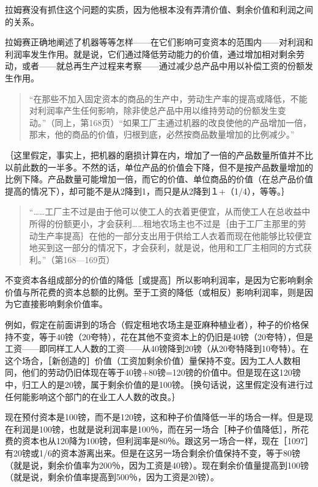 拉姆赛没有抓住这个问题的实质，因为他根本没有弄清价值、剩余价值和利润之间的关系。


拉姆赛正确地阐述了机器等等怎样——在它们影响可变资本的范围内——对利润和利润率发生作用。就是说，它们通过降低劳动能力的价值，通过增加相对剩余劳动，或者——就总再生产过程来考察——通过减少总产品中用以补偿工资的份额发生作用。

\begin{quote}{“在那些不加入固定资本的商品的生产中，劳动生产率的提高或降低，不能对利润率产生任何影响，除非使总产品中用以维持劳动的份额发生变动。”（同上，第168页）“如果工厂主通过机器的改良使他的产品增加一倍，那末，他的商品的价值，归根到底，必然按商品数量增加的比例减少。”}\end{quote}

｛这里假定，事实上，把机器的磨损计算在内，增加了一倍的产品数量所值并不比以前此数的一半多。不然的话，单位产品的价值会下降，但不是按产品数量增加的比例下降。产品数量可能增加一倍，而它的价值、单位商品的价值（在总产品价值提高的情况下），却可能不是从2降到1，而只是从2降到１+（1/4），等等。｝

\begin{quote}{“……工厂主不过是由于他可以使工人的衣着更便宜，从而使工人在总收益中所得的份额更小，才会获利……租地农场主也不过是｛由于工厂主那里的劳动生产率提高｝在他的一部分支出用于供给工人衣着而现在他能够比较便宜地买到这一部分的情况下，才会获利，就是说，他用和工厂主相同的方式获利。”（第168—169页）}\end{quote}

不变资本各组成部分的价值的降低［或提高］所以影响利润率，是因为它影响剩余价值与所花费的资本总额的比例。至于工资的降低（或相反）影响利润率，则是因为它直接影响剩余价值率。

例如，假定在前面讲到的场合（假定租地农场主是亚麻种植业者），种子的价格保持不变，等于40镑（20夸特），花在其他不变资本上的仍旧是40镑（20夸特），但是工资——即同样工人人数的工资——从40镑降到20镑（从20夸特降到10夸特）。在这个场合，［新创造的］价值（工资加剩余价值）量保持不变。因为工人人数相同，他们的劳动仍旧体现在等于40镑+80镑=120镑的价值中。但是现在这120镑中，归工人的是20镑，属于剩余价值的是100镑。｛换句话说，这里假定没有进行过任何能影响这个部门的在业工人人数的改良。｝

现在预付资本是100镑，而不是120镑，这和种子价值降低一半的场合一样。但是现在利润是100镑，也就是说利润率是100％，而在另一场合［种子价值降低］，所花费的资本也从120降为100镑，但利润率是80％。跟这另一场合一样，现在［1097］有20镑或1/6的资本游离出来。但是在这另一场合剩余价值保持不变，等于80镑（就是说，剩余价值率为200％，因为工资是40镑）。现在剩余价值量提高到100镑（就是说，剩余价值率提高到500％，因为工资是20镑）。

